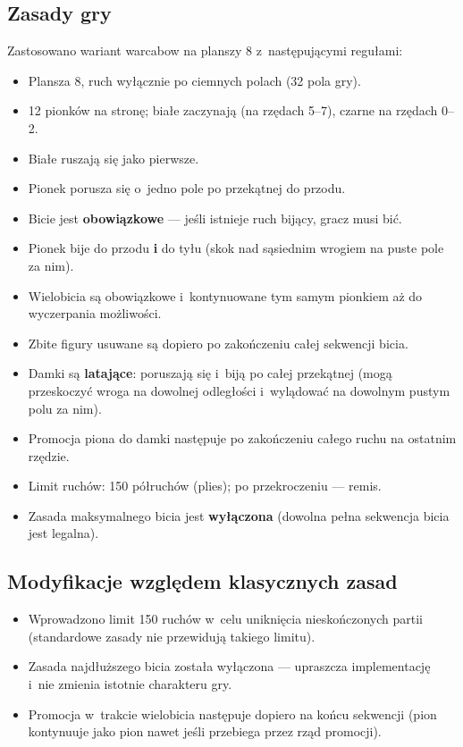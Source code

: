 \documentclass[12pt,a4paper]{article}
\begin{document}
\subsection{Zasady gry}
Zastosowano wariant warcabow na planszy 8 z~następującymi regułami:
\begin{itemize}[nosep]
  \item Plansza 8, ruch wyłącznie po ciemnych polach (32 pola gry).
  \item 12 pionków na stronę; białe zaczynają (na rzędach 5--7), czarne na rzędach 0--2.
  \item Białe ruszają się jako pierwsze.
  \item Pionek porusza się o~jedno pole po przekątnej do przodu.
  \item Bicie jest \textbf{obowiązkowe} — jeśli istnieje ruch bijący, gracz musi bić.
  \item Pionek bije do przodu \textbf{i} do tyłu (skok nad sąsiednim wrogiem na puste pole za nim).
  \item Wielobicia są obowiązkowe i~kontynuowane tym samym pionkiem aż do wyczerpania możliwości.
  \item Zbite figury usuwane są dopiero po zakończeniu całej sekwencji bicia.
  \item Damki są \textbf{latające}: poruszają się i~biją po całej przekątnej (mogą przeskoczyć wroga na dowolnej odległości i~wylądować na dowolnym pustym polu za nim).
  \item Promocja piona do damki następuje po zakończeniu całego ruchu na ostatnim rzędzie.
  \item Limit ruchów: 150 półruchów (plies); po przekroczeniu — remis.
  \item Zasada maksymalnego bicia jest \textbf{wyłączona} (dowolna pełna sekwencja bicia jest legalna).
\end{itemize}

\subsection{Modyfikacje względem klasycznych zasad}
\begin{itemize}[nosep]
  \item Wprowadzono limit 150 ruchów w~celu uniknięcia nieskończonych partii (standardowe zasady nie przewidują takiego limitu).
  \item Zasada najdłuższego bicia została wyłączona — upraszcza implementację i~nie zmienia istotnie charakteru gry.
  \item Promocja w~trakcie wielobicia następuje dopiero na końcu sekwencji (pion kontynuuje jako pion nawet jeśli przebiega przez rząd promocji).
\end{itemize}
\end{document}

